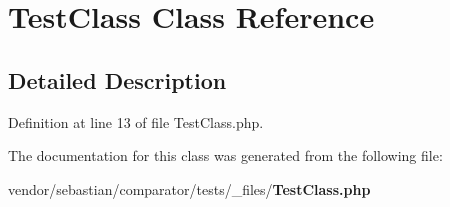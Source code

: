\section{Test\+Class Class Reference}
\label{class_sebastian_bergmann_1_1_comparator_1_1_test_class}


\subsection{Detailed Description}


Definition at line 13 of file Test\+Class.\+php.



The documentation for this class was generated from the following file\+:\begin{DoxyCompactItemize}
\item 
vendor/sebastian/comparator/tests/\+\_\+files/{\bf Test\+Class.\+php}\end{DoxyCompactItemize}
